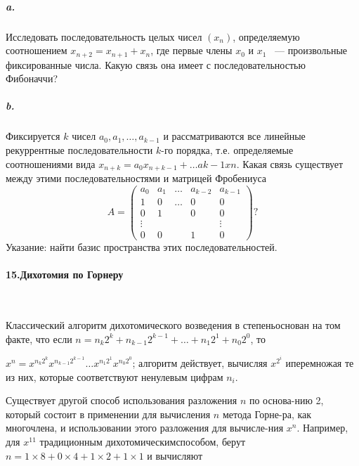 \subparagraph { a.} Исследовать последовательность целых чисел $\left({x_{n}}\right)$, определяемую соотношением $x_{n+2}=x_{n+1}+x_{n}$, где первые члены $x_{0}$ и $x_{1}$ ~--- произвольные фиксированные числа. Какую связь она имеет с последовательностью Фибоначчи? 
\subparagraph { b.} Фиксируется $k$ чисел $a_{0},a_{1},\dots, a_{k-1}$ и рассматриваются все линейные рекуррентные последовательности $k$-го порядка, т.е. определяемые соотношениями вида $x_{n+k}=a_{0}x_{n+k-1}+\dots a{k-1}x{n}$. Какая связь существует между этими последовательностями и матрицей Фробениуса
$$A= \begin{pmatrix} 
a_{0} & a_{1}&\dots    & a_{k-2}& a_{k-1} \\ 
1         & 0        & \dots  & 0           & 0\\
 0        & 1        & {}      & 0           & 0 \\
\vdots & {}      & {}      & {}          & \vdots \\
0         & 0        & {}      & 1           & 0
\end{pmatrix}?$$
Указание: найти базис пространства этих последовательностей.

\paragraph { 15.Дихотомия по Горнеру }\ \newline

Классический алгоритм дихотомического возведения в степень\linebreak основан на\: том\: факте, что\: если\: $n=n_{k}2^{k}+ n_{k-1}2^{k-1}+ \dots + n_{1}2^{1}+ n_{0}2^{0}$,\: то
\newpage
	

\noindent $x^{n}=x^{n_{k}2^{k}} x^{n_{k-1}2^{k-1}} \dots x^{n_{1}2^{1}} x^{n_{0}2^{0}}$; алгоритм действует, вычисляя  $x^{2^{i}}$ и\linebreak перемножая те из них, которые соответствуют ненулевым цифрам $n_{i}$. 

Существует другой способ использования разложения $n$ по основа-\linebreak нию 2, который состоит в применении для вычисления $n$ метода Горне-\linebreak ра, как многочлена, и использовании этого разложения для вычисле-\linebreak ния $x^{n}$. Например, для $x^{11}$ традиционным дихотомическим\linebreak способом, берут $ n=1\times{8}+0\times{4}+1\times{2}+1\times{1}$ и вычисляют 

